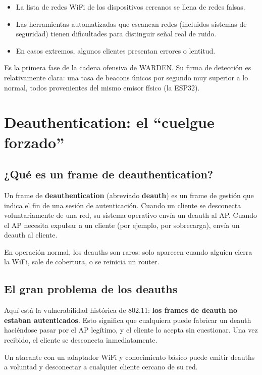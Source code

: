 \documentclass[11pt,a4paper]{article}
\begin{document}
\begin{itemize}
  \item La lista de redes WiFi de los dispositivos cercanos se llena de
    redes falsas.
  \item Las herramientas automatizadas que escanean redes (incluidos
    sistemas de seguridad) tienen dificultades para distinguir señal real
    de ruido.
  \item En casos extremos, algunos clientes presentan errores o lentitud.
\end{itemize}

Es la primera fase de la cadena ofensiva de WARDEN. Su firma de detección
es relativamente clara: una tasa de beacons únicos por segundo muy
superior a lo normal, todos provenientes del mismo emisor físico (la
ESP32).

\section{Deauthentication: el ``cuelgue forzado''}

\subsection{¿Qué es un frame de deauthentication?}
Un frame de \textbf{deauthentication} (abreviado \textbf{deauth}) es un
frame de gestión que indica el fin de una sesión de autenticación. Cuando
un cliente se desconecta voluntariamente de una red, su sistema operativo
envía un deauth al AP. Cuando el AP necesita expulsar a un cliente (por
ejemplo, por sobrecarga), envía un deauth al cliente.

En operación normal, los deauths son raros: solo aparecen cuando alguien
cierra la WiFi, sale de cobertura, o se reinicia un router.

\subsection{El gran problema de los deauths}
Aquí está la vulnerabilidad histórica de 802.11: \textbf{los frames de
deauth no estaban autenticados}. Esto significa que cualquiera puede
fabricar un deauth haciéndose pasar por el AP legítimo, y el cliente lo
acepta sin cuestionar. Una vez recibido, el cliente se desconecta
inmediatamente.

Un atacante con un adaptador WiFi y conocimiento básico puede emitir
deauths a voluntad y desconectar a cualquier cliente cercano de su red.
\end{document}
